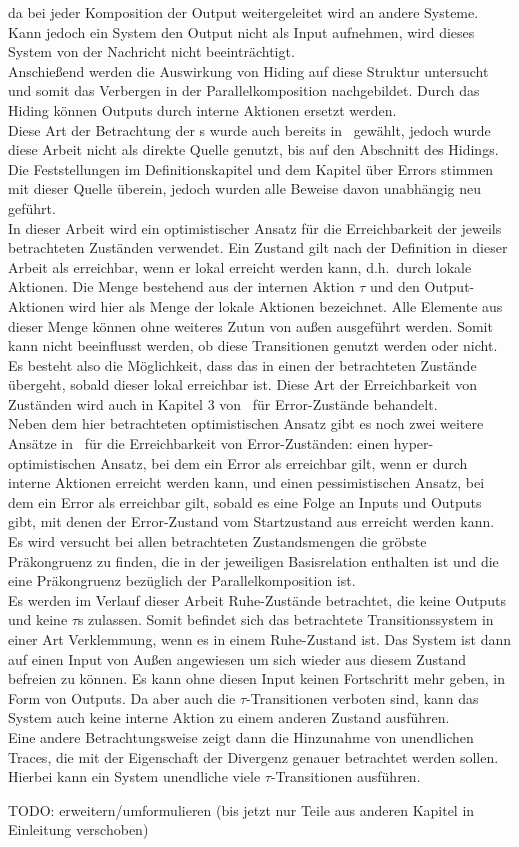 da bei jeder Komposition der Output weitergeleitet wird an andere Systeme.
Kann jedoch ein System den Output nicht als Input aufnehmen, wird dieses System von
der Nachricht nicht beeinträchtigt.\\
Anschießend werden die Auswirkung von Hiding auf diese Struktur
untersucht und somit das Verbergen in der Parallelkomposition nachgebildet.
Durch das Hiding können Outputs durch interne Aktionen ersetzt werden.\\
Diese Art der Betrachtung der
\EIO{}s wurde auch bereits in~\cite{Schlosser2012BA} gewählt, jedoch wurde
diese Arbeit nicht als direkte Quelle genutzt, bis auf den Abschnitt des
Hidings. Die Feststellungen im Definitionskapitel und dem Kapitel über
Errors stimmen mit dieser Quelle überein, jedoch wurden alle Beweise davon unabhängig neu
geführt.\\
In dieser Arbeit wird ein optimistischer Ansatz für die Erreichbarkeit
der jeweils betrachteten Zuständen verwendet. Ein Zustand gilt nach der Definition in dieser
Arbeit als erreichbar, wenn er lokal erreicht
werden kann, d.h.\ durch lokale Aktionen. Die Menge bestehend aus der internen
Aktion $\tau$ und den Output-Aktionen wird hier als Menge der lokale Aktionen
bezeichnet.
Alle Elemente aus dieser Menge können ohne weiteres Zutun von außen ausgeführt
werden. Somit kann nicht beeinflusst werden, ob diese Transitionen genutzt
werden oder nicht. Es besteht also die Möglichkeit, dass das \EIO{} in einen
der betrachteten Zustände übergeht, sobald dieser lokal erreichbar ist. Diese Art der
Erreichbarkeit von Zuständen wird auch in Kapitel 3 von~\cite{Vogler2014EIO}
für Error-Zustände behandelt.\\
Neben dem hier betrachteten optimistischen Ansatz gibt es noch zwei weitere
Ansätze in~\cite{Vogler2014EIO} für die Erreichbarkeit von Error-Zuständen:
einen hyper-optimistischen Ansatz, bei dem ein Error als erreichbar gilt, wenn
er durch interne Aktionen erreicht werden kann, und einen pessimistischen
Ansatz, bei dem ein Error als erreichbar gilt, sobald es eine Folge an Inputs
und Outputs gibt, mit denen der Error-Zustand vom Startzustand aus erreicht
werden kann.\\
Es wird versucht bei allen betrachteten Zustandsmengen die gröbste Präkongruenz zu
finden, die in der jeweiligen Basisrelation enthalten ist und die eine
Präkongruenz bezüglich der Parallelkomposition ist.\\
Es werden im Verlauf dieser Arbeit Ruhe-Zustände betrachtet, die keine Outputs
und keine $\tau$s zulassen. Somit befindet sich das betrachtete
Transitionssystem in einer Art Verklemmung, wenn es in einem Ruhe-Zustand ist.
Das System ist dann auf einen Input von Außen angewiesen um sich wieder aus
diesem Zustand befreien zu können. Es kann ohne diesen Input keinen Fortschritt
mehr geben, in Form von Outputs. Da aber auch die $\tau$-Transitionen verboten
sind, kann das System auch keine interne Aktion zu einem anderen Zustand
ausführen.\\
Eine andere Betrachtungsweise zeigt dann die Hinzunahme von unendlichen Traces,
die mit der Eigenschaft der Divergenz genauer betrachtet werden sollen. Hierbei
kann ein System unendliche viele $\tau$-Transitionen ausführen.

\scriptsize\textcolor{lgray}{TODO: erweitern/umformulieren (bis jetzt nur Teile
aus anderen Kapitel in Einleitung verschoben)}

\normalsize

